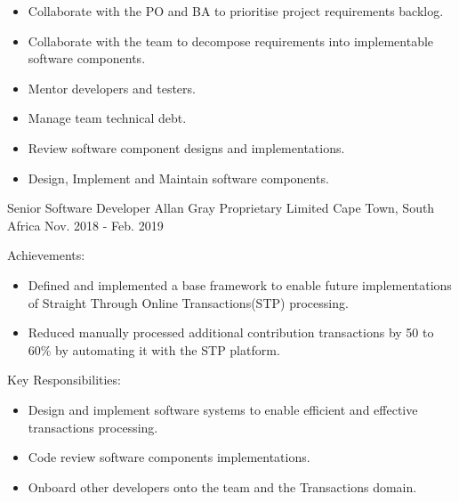 \begin{cventries}
{\begin{cvitems}
\begin{itemize}
          \item {Collaborate with the PO and BA to prioritise project requirements backlog.}
          \item {Collaborate with the team to decompose requirements into implementable software components.}
          \item {Mentor developers and testers.}
          \item {Manage team technical debt.}
          \item {Review software component designs and implementations.}
          \item {Design, Implement and Maintain software components.}
        \end{itemize}
      \end{cvitems}
    }

  \cventry
    {Senior Software Developer} %
    {Allan Gray Proprietary Limited} %
    {Cape Town, South Africa} %
    {Nov. 2018 - Feb. 2019} %
    {
      \begin{cvitems} %
        \item {Achievements:}
        \begin{itemize}
          \item {Defined and implemented a base framework to enable future implementations of Straight Through Online Transactions(STP) processing.}
          \item {Reduced manually processed additional contribution transactions by 50 to 60\% by automating it with the STP platform.}
        \end{itemize}
        \item {Key Responsibilities:}
        \begin{itemize}
          \item {Design and implement software systems to enable efficient and effective transactions processing.}
          \item {Code review software components implementations.}
          \item {Onboard other developers onto the team and the Transactions domain.}
        \end{itemize}
      \end{cvitems}
    }


\end{cventries}

